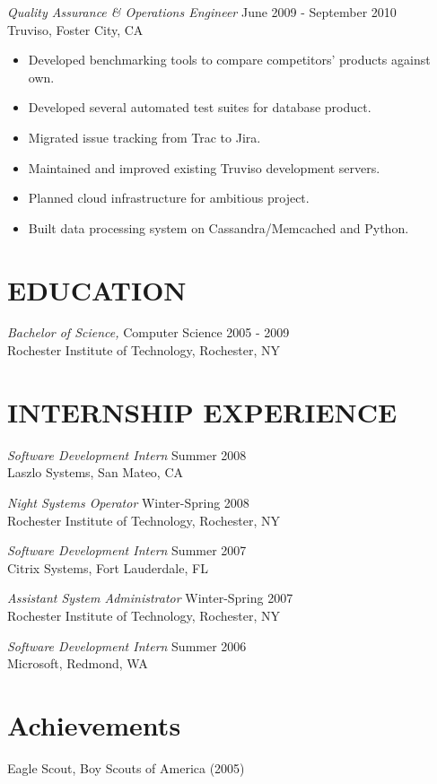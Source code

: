 \documentclass[line,margin]{res}
\begin{document}
\begin{resume}
                {\sl Quality Assurance \& Operations Engineer} \hfill June 2009 - September 2010 \\
                Truviso, Foster City, CA
                \begin{itemize}  \itemsep -2pt %
                 \item Developed benchmarking tools to compare competitors' products against own.
                 \item Developed several automated test suites for database product.
                 \item Migrated issue tracking from Trac to Jira.
                 \item Maintained and improved existing Truviso development servers.
                 \item Planned cloud infrastructure for ambitious project.
                 \item Built data processing system on Cassandra/Memcached and Python.
                \end{itemize}
                
\section{EDUCATION} {\sl Bachelor of Science,} Computer Science \hfill    2005 - 2009 \\
                Rochester Institute of Technology, Rochester, NY
                
\section{INTERNSHIP EXPERIENCE}
                
                {\sl Software Development Intern} \hfill        Summer 2008 \\
                Laszlo Systems, San Mateo, CA
                
                {\sl Night Systems Operator} \hfill        Winter-Spring 2008 \\
                Rochester Institute of Technology, Rochester, NY
                
                {\sl Software Development Intern} \hfill        Summer 2007 \\
                Citrix Systems, Fort Lauderdale, FL
                
                {\sl Assistant System Administrator} \hfill        Winter-Spring 2007 \\
                Rochester Institute of Technology,  Rochester, NY
                
                {\sl Software Development Intern} \hfill          Summer 2006 \\
                Microsoft, Redmond, WA
           
\section{Achievements}             
            Eagle Scout, Boy Scouts of America (2005) \\
 
\end{resume}
\end{document}
